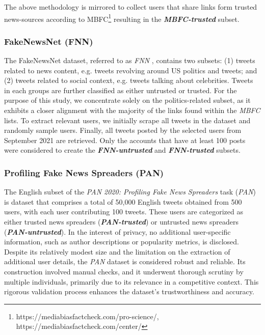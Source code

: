 The above methodology is mirrored to collect users that share links form trusted news-sources according to MBFC\footnote{https://mediabiasfactcheck.com/pro-science/, https://mediabiasfactcheck.com/center/} resulting in the \textbf{\textit{MBFC-trusted}} subset.



\subsubsection{FakeNewsNet (FNN)} 
\label{sec:fnn}
The FakeNewsNet dataset, referred to as \textit{FNN} \cite{shu2020fakenewsnet}, contains two subsets: (1) tweets related to news content, e.g. tweets revolving around US politics and tweets; and (2) tweets related to social context, e.g. tweets talking about celebrities. Tweets in each groups are further classified as either untrusted  or trusted. For the purpose of this study, we concentrate solely on the politics-related subset, as it exhibits a closer alignment with the majority of the links found within the \textit{MBFC} lists. To extract relevant users, we initially scrape all tweets in the dataset and randomly sample users. Finally, all tweets posted by the selected users from September 2021 are retrieved. Only the accounts that have at least 100 posts were considered to create the \textbf{\textit{FNN-untrusted}} and \textbf{\textit{FNN-trusted}} subsets.


\subsubsection{Profiling Fake News Spreaders (PAN)}
\label{sec:pan}

The English subset of the \textit{PAN 2020: Profiling Fake News Spreaders} task (\textit{PAN}) \cite{rangel2020overview} is dataset that comprises a total of 50,000 English tweets obtained from 500 users, with each user contributing 100 tweets. These users are categorized as either trusted news spreaders (\textbf{\textit{PAN-trusted}}) or untrusted news spreaders (\textbf{\textit{PAN-untrusted}}). In the interest of privacy, no additional user-specific information, such as author descriptions or popularity metrics, is disclosed. Despite its relatively modest size and the limitation on the extraction of additional user details, the \textit{PAN} dataset is considered robust and reliable. Its construction involved manual checks, and it underwent thorough scrutiny by multiple individuals, primarily due to its relevance in a competitive context. This rigorous validation process enhances the dataset's trustworthiness and accuracy.


